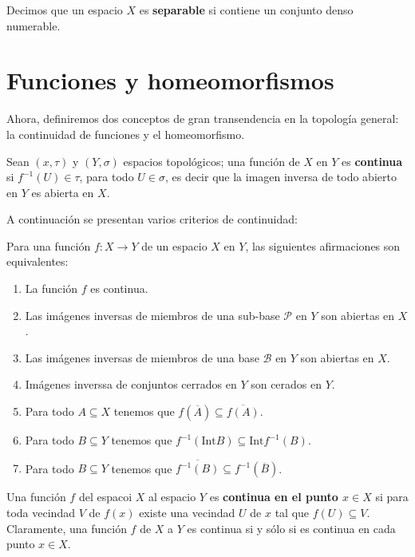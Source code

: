 \documentclass[12pt]{report}
\theoremstyle{largebreak}
\newcommand{\eul}[1]{\ensuremath{\mathscr{#1}}}
\newcommand{\Int}[1]{\text{Int}\ensuremath{#1}}
\newcommand{\cf}[3]{\ensuremath{#1:#2\rightarrow#3}}
\begin{document}
    \begin{mydef}
        Decimos que un espacio $X$ es \textbf{separable} si contiene un conjunto denso numerable.
    \end{mydef}

    \section{Funciones y homeomorfismos}

    Ahora, definiremos dos conceptos de gran transendencia en la topología general: la continuidad de funciones y el homeomorfismo.

    \begin{mydef}
        Sean $(x,\tau)$ y $(Y,\sigma)$ espacios topológicos; una función de $X$ en $Y$ es \textbf{continua} si $f^{-1}(U)\in\tau$, para todo $U\in\sigma$, es decir que la imagen inversa de todo abierto en $Y$ es abierta en $X$.
    \end{mydef}

    A continuación se presentan varios criterios de continuidad:

    \begin{propo}
        Para una función $\cf{f}{X}{Y}$ de un espacio $X$ en $Y$, las siguientes afirmaciones son equivalentes:
        \begin{enumerate}
            \item La función $f$ es continua.
            \item Las imágenes inversas de miembros de una sub-base $\eul{P}$ en $Y$ son abiertas en $X$.
            \item Las imágenes inversas de miembros de una base $\eul{B}$ en $Y$ son abiertas en $X$.
            \item Imágenes inverssa de conjuntos cerrados en $Y$ son cerados en $Y$.
            \item Para todo $A\subseteq X$ tenemos que $f(\overline{A})\subseteq\overline{f(A)}$.
            \item Para todo $B\subseteq Y$ tenemos que $f^{-1}(\Int{B})\subseteq\Int{f^{-1}(B)}$.
            \item Para todo $B\subseteq Y$ tenemos que $\overline{f^{-1}(B)}\subseteq f^{-1}(\overline{B})$.
        \end{enumerate}
    \end{propo}

    Una función $f$ del espacoi $X$ al espacio $Y$ es \textbf{continua en el punto $x\in X$} si para toda vecindad $V$ de $f(x)$ existe una vecindad $U$ de $x$ tal que $f(U)\subseteq V$. Claramente, una función $f$ de $X$ a $Y$ es continua si y sólo si es continua en cada punto $x\in X$.
\end{document}
